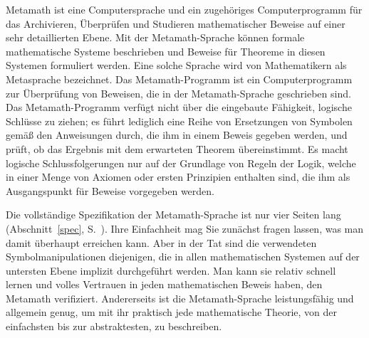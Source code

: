 Metamath ist eine Computersprache und ein zugehöriges Computerprogramm für das Archivieren, Überprüfen und Studieren mathematischer Beweise auf einer sehr detaillierten Ebene.
Mit der Metamath-Sprache können formale mathematische Systeme beschrieben und Beweise für Theoreme in diesen Systemen formuliert werden.  Eine solche Sprache wird von Mathematikern als Metasprache bezeichnet. Das Metamath-Programm ist ein Computerprogramm zur Überprüfung von Beweisen, die in der Metamath-Sprache geschrieben sind.  Das Metamath-Programm verfügt nicht über die eingebaute Fähigkeit, logische Schlüsse zu ziehen; es führt lediglich eine Reihe von Ersetzungen von Symbolen gemäß den Anweisungen durch, die ihm in einem Beweis gegeben werden, und prüft, ob das Ergebnis mit dem erwarteten Theorem übereinstimmt.  Es macht logische  Schlussfolgerungen nur auf der Grundlage von Regeln der Logik, welche in einer Menge von Axiomen oder ersten Prinzipien enthalten sind, die ihm als Ausgangspunkt für Beweise vorgegeben werden.
	
Die vollständige Spezifikation der Metamath-Sprache ist nur vier Seiten lang (Abschnitt~\ref{spec}, S.~\pageref{spec}).  Ihre Einfachheit mag Sie zunächst fragen lassen, was man damit überhaupt erreichen kann.  Aber in der Tat sind die verwendeten Symbolmanipulationen diejenigen, die in allen mathematischen Systemen auf der untersten Ebene implizit durchgeführt werden.  Man kann sie relativ schnell lernen und volles Vertrauen in jeden mathematischen Beweis haben, den Metamath verifiziert.  Andererseits ist die Metamath-Sprache leistungsfähig und allgemein genug, um mit ihr  praktisch jede mathematische Theorie, von der einfachsten bis zur abstraktesten, zu beschreiben.

